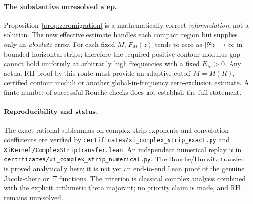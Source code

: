 \paragraph{The substantive unresolved step.}
Proposition~\ref{prop:zeromigration}
is a mathematically correct
\emph{reformulation}, not a solution.
The new effective estimate handles
each compact region but supplies
only an \emph{absolute} error.
For each fixed $M$, $F_M(z)$
tends to zero as
$|\Re z|\to\infty$ in
bounded horizontal strips;
therefore the required
positive contour-modulus gap
cannot hold uniformly at
arbitrarily high frequencies
with a fixed $E_M>0$.
Any actual RH proof by this
route must provide an
adaptive cutoff $M=M(R)$,
certified contour moduli
or another global-in-frequency
zero-exclusion estimate.
A finite number of successful
Rouch\'e checks does not
establish the full statement.

\paragraph{Reproducibility and status.}
The exact rational sublemmas
on complex-strip exponents
and convolution coefficients
are verified by
\texttt{certificates/xi\_complex\_strip\_exact.py}
and
\texttt{XiKernel/ComplexStripTransfer.lean}.
An independent numerical
replay is in
\texttt{certificates/xi\_complex\_strip\_numerical.py}.
The Rouch\'e/Hurwitz transfer
is proved analytically here;
it is not yet an end-to-end
Lean proof of the genuine
Jacobi-theta or $\Xi$ functions.
The criterion is classical
complex analysis combined with
the explicit arithmetic
theta majorant; no priority
claim is made, and RH remains
unresolved.
